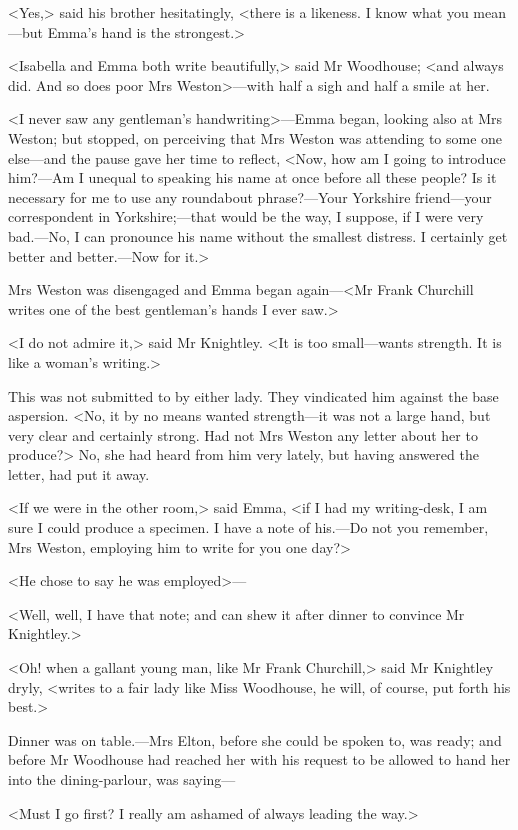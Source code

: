 <Yes,> said his brother hesitatingly, <there is a likeness. I know what you mean—but Emma's hand is the strongest.>

<Isabella and Emma both write beautifully,> said Mr Woodhouse; <and always did. And so does poor Mrs Weston>—with half a sigh and half a smile at her.

<I never saw any gentleman's handwriting>—Emma began, looking also at Mrs Weston; but stopped, on perceiving that Mrs Weston was attending to some one else—and the pause gave her time to reflect, <Now, how am I going to introduce him?—Am I unequal to speaking his name at once before all these people? Is it necessary for me to use any roundabout phrase?—Your Yorkshire friend—your correspondent in Yorkshire;—that would be the way, I suppose, if I were very bad.—No, I can pronounce his name without the smallest distress. I certainly get better and better.—Now for it.>

Mrs Weston was disengaged and Emma began again—<Mr Frank Churchill writes one of the best gentleman's hands I ever saw.>

<I do not admire it,> said Mr Knightley. <It is too small—wants strength. It is like a woman's writing.>

This was not submitted to by either lady. They vindicated him against the base aspersion. <No, it by no means wanted strength—it was not a large hand, but very clear and certainly strong. Had not Mrs Weston any letter about her to produce?> No, she had heard from him very lately, but having answered the letter, had put it away.

<If we were in the other room,> said Emma, <if I had my writing-desk, I am sure I could produce a specimen. I have a note of his.—Do not you remember, Mrs Weston, employing him to write for you one day?>

<He chose to say he was employed>—

<Well, well, I have that note; and can shew it after dinner to convince Mr Knightley.>

<Oh! when a gallant young man, like Mr Frank Churchill,> said Mr Knightley dryly, <writes to a fair lady like Miss Woodhouse, he will, of course, put forth his best.>

Dinner was on table.—Mrs Elton, before she could be spoken to, was ready; and before Mr Woodhouse had reached her with his request to be allowed to hand her into the dining-parlour, was saying—

<Must I go first? I really am ashamed of always leading the way.>

